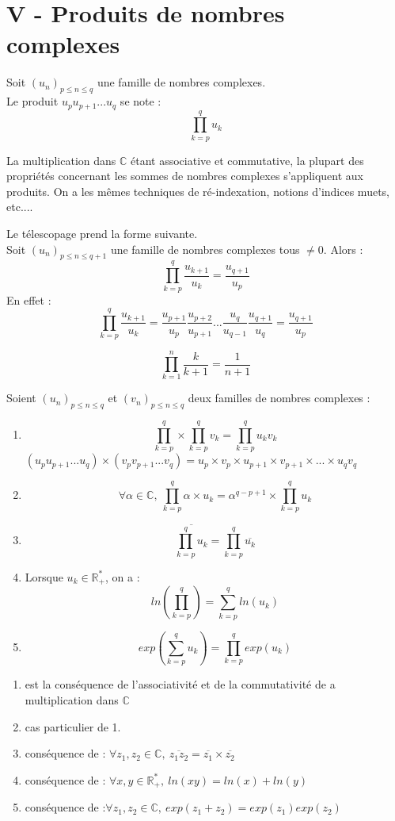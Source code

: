 \documentclass[a4paper,11pt]{article}
\newcommand{\R}{\mathbb{R}}
\newcommand{\C}{\mathbb{C}}
\newcommand{\encadLEQ}[3]{#1 \leq #2 \leq #3}
\newcommand{\famille}[2]{(#1)_{#2}}
\begin{document}
\section*{V - Produits de nombres complexes}

Soit $\famille{u_n}{\encadLEQ{p}{n}{q}}$ une famille de nombres complexes.\\
Le produit $u_pu_{p+1}...u_q$ se note :
$$\prod_{k=p}^{q}u_k$$

La multiplication dans $\C$ étant associative et commutative, la plupart des propriétés concernant les sommes de nombres complexes s'appliquent aux produits.
On a les mêmes techniques de ré-indexation, notions d'indices muets, etc....

Le télescopage prend la forme suivante.\\
Soit $\famille{u_n}{\encadLEQ{p}{n}{q+1}}$ une famille de nombres complexes tous $\neq 0$.
Alors :
$$\prod_{k=p}^{q}\dfrac{u_{k+1}}{u_k} = \dfrac{u_{q+1}}{u_p}$$
En effet :
$$\prod_{k=p}^{q}\dfrac{u_{k+1}}{u_k} = \dfrac{u_{p+1}}{u_p} \dfrac{u_{p+2}}{u_{p+1}} ... \dfrac{u_q}{u_{q-1}} \dfrac{u_{q+1}}{u_q} = \dfrac{u_{q+1}}{u_p}$$

\begin{exemples}
	$$\prod_{k=1}^{n}\dfrac{k}{k+1} = \dfrac{1}{n+1}$$
\end{exemples}

\begin{proposition}
	Soient $\famille{u_n}{\encadLEQ{p}{n}{q}}$ et $\famille{v_n}{\encadLEQ{p}{n}{q}}$ deux familles de nombres complexes :
	\begin{enumerate}
		\item $$\prod_{k=p}^{q} \times \prod_{k=p}^{q}v_k = \prod_{k=p}^{q}u_kv_k$$
		$(u_pu_{p+1}...u_q)\times(v_pv_{p+1}...v_q) = u_p\times v_p \times u_{p+1}\times v_{p+1} \times ... \times u_qv_q$
		\item $$\forall\alpha\in\C, \: \prod_{k=p}^{q}\alpha \times u_k = \alpha^{q-p+1}\times \prod_{k=p}^{q}u_k$$
		\item $$\overline{\prod_{k=p}^{q}u_k} = \prod_{k=p}^{q}\overline{u_k}$$
		\item Lorsque $u_k \in\R_+^*$, on a :
		$$ln(\prod_{k=p}^{q}) = \sum_{k=p}^{q}ln(u_k)$$
		\item $$exp(\sum_{k=p}^{q}u_k) = \prod_{k=p}^{q}exp(u_k)$$
	\end{enumerate}
\end{proposition}

\newpage

\begin{remarque}
	\begin{enumerate}
		\item est la conséquence de l'associativité et de la commutativité de a multiplication dans $\C$
		\item cas particulier de 1.
		\item conséquence de : $\forall z_1,z_2\in\C, \: \overline{z_1z_2} = \overline{z_1}\times\overline{z_2}$
		\item conséquence de : $\forall x,y \in\R_+^*, \: ln(xy) = ln(x) + ln(y)$
		\item conséquence de :$\forall z_1,z_2\in\C, \: exp(z_1 + z_2) = exp(z_1)exp(z_2)$
	\end{enumerate}
\end{remarque}
\end{document}
